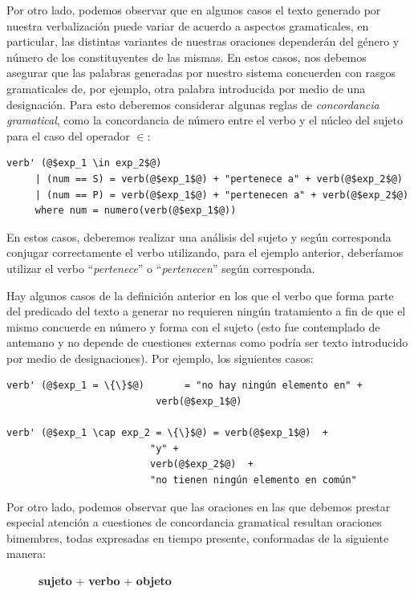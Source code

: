 Por otro lado, podemos observar que en algunos casos el texto generado por nuestra verbalización puede variar de acuerdo a aspectos gramaticales, en particular, las distintas variantes de nuestras oraciones dependerán del género y número de los constituyentes de las mismas. En estos casos, nos debemos asegurar que las palabras generadas por nuestro sistema concuerden con rasgos gramaticales de, por ejemplo, otra palabra introducida por medio de una designación. Para esto deberemos considerar algunas reglas de \emph{concordancia gramatical}, como la concordancia de número entre el verbo y el núcleo del sujeto para el caso del operador $\in$:


\bigskip
\begin{verbatim}
verb' (@$exp_1 \in exp_2$@)
     | (num == S) = verb(@$exp_1$@) + "pertenece a" + verb(@$exp_2$@) 
     | (num == P) = verb(@$exp_1$@) + "pertenecen a" + verb(@$exp_2$@) 
     where num = numero(verb(@$exp_1$@))
\end{verbatim} 

\bigskip
En estos casos, deberemos realizar una análisis del sujeto y según corresponda conjugar correctamente el verbo utilizando, para el ejemplo anterior, deberíamos utilizar el verbo ``\emph{pertenece}'' o ``\emph{pertenecen}'' según corresponda.

Hay algunos casos de la definición anterior en los que el verbo que forma parte del predicado del texto a generar no requieren ningún tratamiento a fin de que el mismo concuerde en número y forma con el sujeto (esto fue contemplado de antemano y no depende de cuestiones externas como podría ser texto introducido por medio de designaciones). Por ejemplo, los siguientes casos:

\bigskip
\begin{verbatim}
verb' (@$exp_1 = \{\}$@)       = "no hay ningún elemento en" + 
                          verb(@$exp_1$@) 
                                 
verb' (@$exp_1 \cap exp_2 = \{\}$@) = verb(@$exp_1$@)  +  
                         "y" +  
                         verb(@$exp_2$@)  +  
                         "no tienen ningún elemento en común"
\end{verbatim} 

\bigskip
Por otro lado, podemos observar que las oraciones en las que debemos prestar especial atención a cuestiones de concordancia gramatical resultan oraciones bimembres, todas expresadas en tiempo presente, conformadas de la siguiente manera: 
\begin{figure}[H]
\center
\textbf{sujeto} + \textbf{verbo} + \textbf{objeto}
\end{figure}

